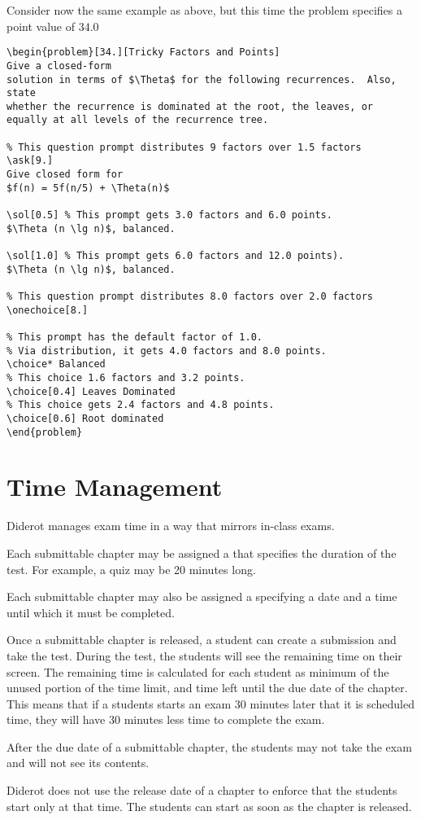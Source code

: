 \begin{example}
Consider now the same example as above, but this time
the problem specifies a point value of $34.0$
\begin{lstlisting}
\begin{problem}[34.][Tricky Factors and Points]
Give a closed-form
solution in terms of $\Theta$ for the following recurrences.  Also, state
whether the recurrence is dominated at the root, the leaves, or
equally at all levels of the recurrence tree.

% This question prompt distributes 9 factors over 1.5 factors
\ask[9.]
Give closed form for  
$f(n) = 5f(n/5) + \Theta(n)$

\sol[0.5] % This prompt gets 3.0 factors and 6.0 points.
$\Theta (n \lg n)$, balanced.

\sol[1.0] % This prompt gets 6.0 factors and 12.0 points).
$\Theta (n \lg n)$, balanced.

% This question prompt distributes 8.0 factors over 2.0 factors 
\onechoice[8.] 

% This prompt has the default factor of 1.0.
% Via distribution, it gets 4.0 factors and 8.0 points. 
\choice* Balanced 
% This choice 1.6 factors and 3.2 points.
\choice[0.4] Leaves Dominated  
% This choice gets 2.4 factors and 4.8 points.
\choice[0.6] Root dominated   
\end{problem}
\end{lstlisting}
\end{example}

\section{Time Management}

Diderot manages exam time in a way that mirrors in-class exams.

\begin{gram}
Each submittable chapter may be assigned a  that
specifies the duration of the test.  For example, a quiz may be 20
minutes long.

Each submittable chapter may also be assigned a  specifying a date and a time until which it must be completed. 
\end{gram}

\begin{gram}
Once a submittable chapter is released, a student can create a submission and take the test.  During the test, the students will see the remaining time on their screen.  The remaining time is calculated for each student as minimum of the unused portion of the time limit, and time left until the due date of the chapter.  This means that if a students starts an exam 30 minutes later that it is scheduled time, they will have 30 minutes less time to complete the exam.

After the due date of a submittable chapter, the students may not take the exam and will not see its contents.

Diderot does not use the release date of a chapter to enforce that the students start only at that time.  The students can start as soon as the chapter is released.
\end{gram}

